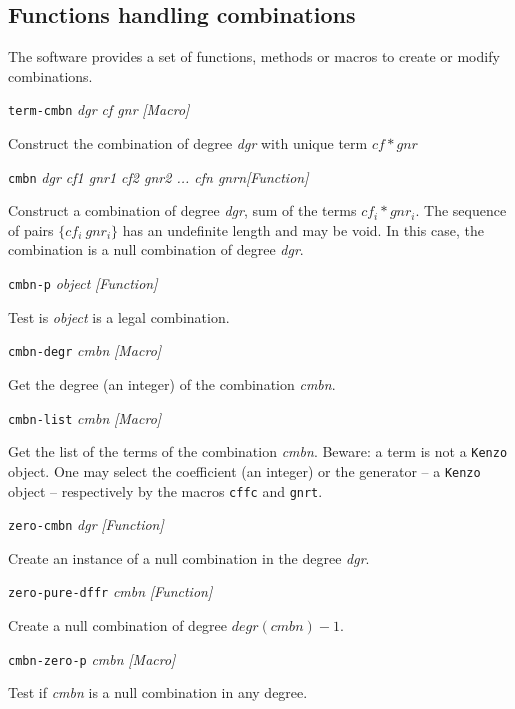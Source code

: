 \subsection {Functions handling  combinations}

The software provides a set of functions, methods or macros to create or modify 
combinations. 
\vskip 0.45cm
{\parindent=0mm
{\leftskip=5mm 
{\tt term-cmbn} {\em dgr cf gnr} \hfill {\em [Macro]}\par}
{\leftskip=15mm 
Construct the combination of degree {\em dgr} with unique term $cf * gnr$ \par}
{\leftskip=5mm 
{\tt cmbn} {\em dgr cf1 gnr1 cf2 gnr2 ... cfn gnrn}\hfill {\em [Function]} \par}
{\leftskip=15mm 
Construct a combination of degree {\em dgr}, sum of the terms $cf_i *  gnr_i$. The sequence of pairs
$\lbrace cf_i\  gnr_i \rbrace$ has an undefinite length and  may be void. In this case,  the combination
is a null combination of degree {\em dgr}.  \par}
{\leftskip=5mm 
{\tt cmbn-p} {\em object} \hfill {\em [Function]}\par}
{\leftskip=15mm 
Test is {\em object} is a legal combination. \par}
{\leftskip=5mm 
{\tt cmbn-degr} {\em cmbn}   \hfill {\em [Macro]} \par}
{\leftskip=15mm 
Get the degree (an integer) of the combination {\em cmbn}. \par}
{\leftskip=5mm 
{\tt cmbn-list} {\em cmbn}   \hfill {\em [Macro]} \par}
{\leftskip=15mm 
Get the list of the terms  of the combination {\em cmbn}. Beware: a term is not a {\tt Kenzo} object.
One may select the coefficient (an integer) or the generator -- a {\tt Kenzo} object -- 
respectively by the macros {\tt cffc} and {\tt gnrt}. \par}
{\leftskip=5mm 
{\tt zero-cmbn} {\em dgr}   \hfill {\em [Function]} \par}
{\leftskip=15mm 
Create an instance of a null combination in the degree {\em dgr}. \par}
{\leftskip=5mm 
{\tt zero-pure-dffr} {\em cmbn} \hfill {\em [Function]} \par}
{\leftskip=15mm 
Create  a null combination of degree $degr(cmbn) - 1$. \par}
{\leftskip=5mm 
{\tt cmbn-zero-p} {\em cmbn} \hfill {\em [Macro]}\par}
{\leftskip=15mm 
Test if {\em cmbn} is a null combination in any degree. \par}
}
